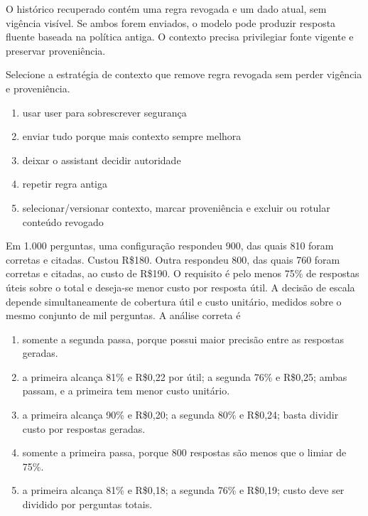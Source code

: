 \documentclass[12pt,a4paper]{article}
\begin{document}

\TextoBase

O histórico recuperado contém uma regra revogada e um dado atual, sem vigência visível. Se ambos forem enviados, o modelo pode produzir resposta fluente baseada na política antiga. O contexto precisa privilegiar fonte vigente e preservar proveniência.

\FonteDidatica

\Comando Selecione a estratégia de contexto que remove regra revogada sem perder vigência e proveniência.

\begin{enumerate}[label=\Alph*)]
  \item usar user para sobrescrever segurança
  \item enviar tudo porque mais contexto sempre melhora
  \item deixar o assistant decidir autoridade
  \item repetir regra antiga
  \item selecionar/versionar contexto, marcar proveniência e excluir ou rotular conteúdo revogado
\end{enumerate}

\TextoBase
Em 1.000 perguntas, uma configuração respondeu 900, das quais 810 foram corretas e citadas. Custou R\$180. Outra respondeu 800, das quais 760 foram corretas e citadas, ao custo de R\$190. O requisito é pelo menos 75\% de respostas úteis sobre o total e deseja-se menor custo por resposta útil.
A decisão de escala depende simultaneamente de cobertura útil e custo unitário, medidos sobre o mesmo conjunto de mil perguntas.
\FonteDidatica
\Comando A análise correta é
\begin{enumerate}[label=\Alph*)]
  \item somente a segunda passa, porque possui maior precisão entre as respostas geradas.
  \item a primeira alcança 81\% e R\$0,22 por útil; a segunda 76\% e R\$0,25; ambas passam, e a primeira tem menor custo unitário.
  \item a primeira alcança 90\% e R\$0,20; a segunda 80\% e R\$0,24; basta dividir custo por respostas geradas.
  \item somente a primeira passa, porque 800 respostas são menos que o limiar de 75\%.
  \item a primeira alcança 81\% e R\$0,18; a segunda 76\% e R\$0,19; custo deve ser dividido por perguntas totais.
\end{enumerate}
\end{document}

